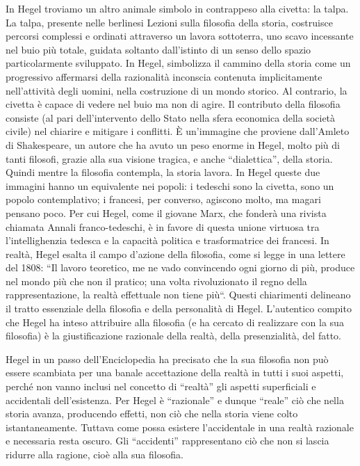 \documentclass[a4paper,12pt,oneside,openany]{book}%
\begin{document}
In Hegel troviamo un altro animale simbolo in contrappeso alla civetta: la talpa. La talpa, presente nelle berlinesi Lezioni sulla filosofia della storia, costruisce percorsi complessi e ordinati attraverso un lavora sottoterra, uno scavo incessante nel buio più totale, guidata soltanto dall’istinto di un senso dello spazio particolarmente sviluppato. In Hegel, simbolizza il cammino della storia come un progressivo affermarsi della razionalità inconscia contenuta implicitamente nell’attività degli uomini, nella costruzione di un mondo storico. Al contrario, la civetta è capace di vedere nel buio ma non di agire. Il contributo della filosofia consiste (al pari dell’intervento dello Stato nella sfera economica della società civile) nel chiarire e mitigare i conflitti. È un’immagine che proviene dall’Amleto di Shakespeare, un autore che ha avuto un peso enorme in Hegel, molto più di tanti filosofi, grazie alla sua visione tragica, e anche “dialettica”, della storia. Quindi mentre la filosofia contempla, la storia lavora. In Hegel queste due immagini hanno un equivalente nei popoli: i tedeschi sono la civetta, sono un popolo contemplativo; i francesi, per converso, agiscono molto, ma magari pensano poco. Per cui Hegel, come il giovane Marx, che fonderà una rivista chiamata Annali franco-tedeschi, è in favore di questa unione virtuosa tra l’intellighenzia tedesca e la capacità politica e trasformatrice dei francesi. In realtà, Hegel esalta il campo d’azione della filosofia, come si legge in una lettere del 1808: “Il lavoro teoretico, me ne vado convincendo ogni giorno di più, produce nel mondo più che non il pratico; una volta rivoluzionato il regno della rappresentazione, la realtà effettuale non tiene più“. Questi chiarimenti delineano il tratto essenziale della filosofia e della personalità di Hegel. L’autentico compito che Hegel ha inteso attribuire alla filosofia (e ha cercato di realizzare con la sua filosofia) è la giustificazione razionale della realtà, della presenzialità, del fatto.

Hegel in un passo dell’Enciclopedia ha precisato che la sua filosofia non può essere scambiata per una banale accettazione della realtà in tutti i suoi aspetti, perché non vanno inclusi nel concetto di “realtà” gli aspetti superficiali e accidentali dell’esistenza. Per Hegel è “razionale” e dunque “reale” ciò che nella storia avanza, producendo effetti, non ciò che nella storia viene colto istantaneamente. Tuttava come possa esistere l’accidentale in una realtà razionale e necessaria resta oscuro. Gli “accidenti” rappresentano ciò che non si lascia ridurre alla ragione, cioè alla sua filosofia.
\end{document}
